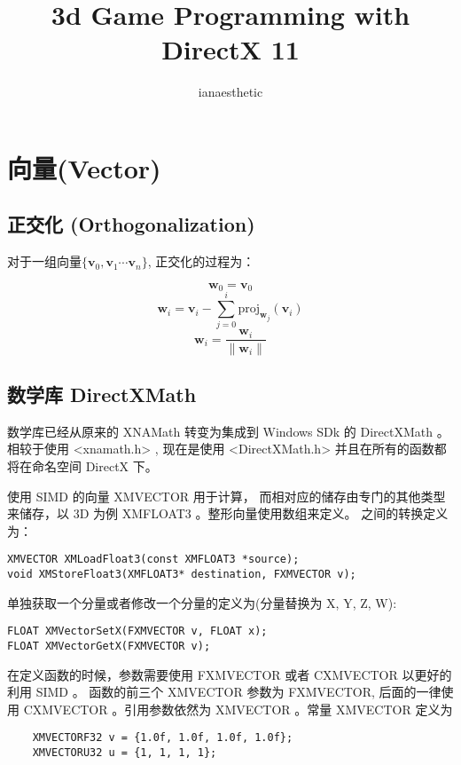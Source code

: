 \documentclass[10pt, a4paper]{article}
\author{ianaesthetic}
\title{3d Game Programming with DirectX 11}
\begin{document}
\maketitle
\newpage

\section{向量(Vector)}
    \subsection{正交化 (Orthogonalization)}
        对于一组向量$\{ \textbf{v}_0, \textbf{v}_1 \cdots \textbf{v}_n \}$, 正交化的过程为：

        $$\textbf{w}_0 = \textbf{v}_0$$
        $$\textbf{w}_i = \textbf{v}_i - \sum_{j = 0}^{i}\text{proj}_{\textbf{w}_j}(\textbf{v}_i)$$
        $$\textbf{w}_i = \frac{\textbf{w}_i}{\parallel \textbf{w}_i \parallel}$$

    \subsection{数学库 DirectXMath}
        数学库已经从原来的 XNAMath 转变为集成到 Windows SDk 的 DirectXMath 。 相较于使用 <xnamath.h> , 现在是使用 <DirectXMath.h> 并且在所有的函数都将在命名空间 DirectX 下。
        
        使用 SIMD 的向量 XMVECTOR 用于计算， 而相对应的储存由专门的其他类型来储存，以 3D 为例 XMFLOAT3 。整形向量使用数组来定义。 之间的转换定义为： 
\begin{lstlisting}  
XMVECTOR XMLoadFloat3(const XMFLOAT3 *source);
void XMStoreFloat3(XMFLOAT3* destination, FXMVECTOR v); 
\end{lstlisting}
        
        单独获取一个分量或者修改一个分量的定义为(分量替换为 X, Y, Z, W):
\begin{lstlisting}
FLOAT XMVectorSetX(FXMVECTOR v, FLOAT x); 
FLOAT XMVectorGetX(FXMVECTOR v); 
\end{lstlisting}

        在定义函数的时候，参数需要使用 FXMVECTOR 或者 CXMVECTOR 以更好的利用 SIMD 。 函数的前三个 XMVECTOR 参数为 FXMVECTOR, 后面的一律使用 CXMVECTOR 。引用参数依然为 XMVECTOR 。常量 XMVECTOR 定义为 
\begin{lstlisting}
    XMVECTORF32 v = {1.0f, 1.0f, 1.0f, 1.0f}; 
    XMVECTORU32 u = {1, 1, 1, 1}; 
\end{lstlisting}
    
    \medskip
\end{document}
